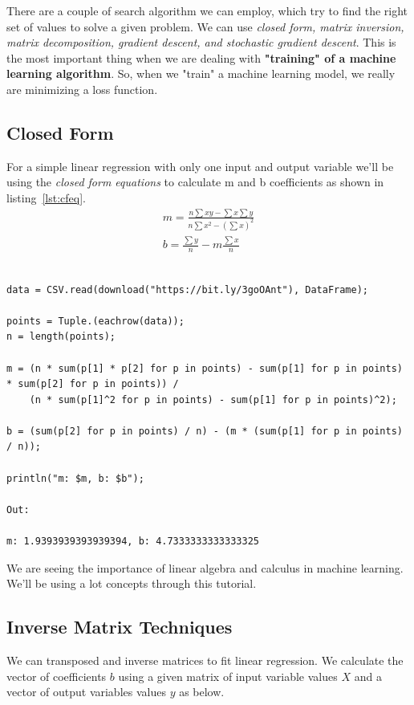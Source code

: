 \documentclass[a4paper, 11pt]{article}
\begin{document}
There are a couple of search algorithm we can employ, which try to find the right set of values to solve a given problem. We can use \textit{closed form, matrix inversion, matrix decomposition, gradient descent, and stochastic gradient descent}. This is the most important thing when we are dealing with \textbf{"training" of a machine learning algorithm}. So, when we "train" a machine learning model, we really are minimizing a loss function.
\subsection{Closed Form}

For a simple linear regression with only one input and output variable we'll be using the \textit{closed form equations} to calculate m and b coefficients as shown in listing~\ref{lst:cfeq}.
\begin{equation}
\begin{aligned}
m = \frac{n\sum xy - \sum x \sum y}{n\sum x^2 - (\sum x)^2}\\[10pt]
b = \frac{\sum y}{n} -m\frac{\sum x}{n}
\end{aligned}
\end{equation}

\begin{lstlisting}[caption={Calculating m and b using closed form equations for simple linear regressions},label={lst:cfeq}]

data = CSV.read(download("https://bit.ly/3goOAnt"), DataFrame);

points = Tuple.(eachrow(data));
n = length(points);

m = (n * sum(p[1] * p[2] for p in points) - sum(p[1] for p in points) * sum(p[2] for p in points)) /
    (n * sum(p[1]^2 for p in points) - sum(p[1] for p in points)^2);

b = (sum(p[2] for p in points) / n) - (m * (sum(p[1] for p in points) / n));

println("m: $m, b: $b");

Out:

m: 1.9393939393939394, b: 4.7333333333333325

\end{lstlisting}

We are seeing the importance of linear algebra and calculus in machine learning. We'll be using a lot concepts through this tutorial.

\subsection{Inverse Matrix Techniques}
We can transposed and inverse matrices to fit linear regression. We calculate the vector of coefficients $b$ using a given matrix of input variable values $X$ and a vector of output variables values $y$ as below.
\end{document}
